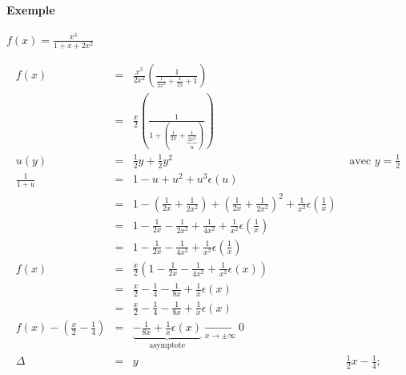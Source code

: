 \paragraph{Exemple} $f(x) = \frac{x^3}{1+x+2x^2}$

\[\begin{array}{rclr}
f(x) &=& \frac{x^3}{2x^2}(\frac{1}{\frac{1}{2x^2} + \frac{1}{2x}+1}) \\
	&=& \frac{x}{2}(\frac{1}{1+(\frac{1}{2x}+\underbrace{\frac{1}{2x^2}}_{u})}) \\
u(y) &=& \frac{1}{2}y + \frac{1}{2}y^2 & \text{ avec } y = \frac{1}{2} \\
\frac{1}{1+u} &=& 1-u+u^2+u^3 \epsilon (u) \\
&=& 1 - (\frac{1}{2x} + \frac{1}{2x^2}) + (\frac{1}{2x} + \frac{1}{2x^2})^2 +  \frac{1}{x^2}\epsilon(\frac{1}{x}) \\
&=& 1 - \frac{1}{2x} - \frac{1}{2x^2} + \frac{1}{4x^2} + \frac{1}{x^2}\epsilon(\frac{1}{x}) \\
&=& 1 - \frac{1}{2x} - \frac{1}{4x^2} + \frac{1}{x^2} \epsilon (\frac{1}{x})
\\
f(x) &=& \frac{x}{2}(1-\frac{1}{2x}-\frac{1}{4x^2}+\frac{1}{x^2}\epsilon (x)) \\
&=& \frac{x}{2} - \frac{1}{4} - \frac{1}{8x} + \frac{1}{x}\epsilon (x) \\
&=& \frac{x}{2} - \frac{1}{4} - \frac{1}{8x} + \frac{1}{x}\epsilon (x) \\
f(x) - (\frac{x}{2}-\frac{1}{4}) &=& \underbrace{-\frac{1}{8x} +  \frac{1}{x}\epsilon (x) }_{\text{asymptote}} \xrightarrow[x \to \pm \infty]{} 0 \\
\Delta &=& y & \frac{1}{2}x - \frac{1}{4};
\end{array}\]

